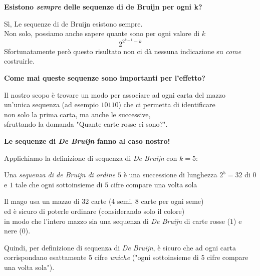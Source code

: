 \documentclass[8pt]{beamer}
\theoremstyle{plain}
\theoremstyle{definition}
\begin{document}
\begin{frame}
\begin{center}
 \textbf{Esistono \emph{sempre} delle sequenze di de Bruijn per ogni k?} 

\bigskip
\bigskip

Sì, Le sequenze di de Bruijn esistono sempre. \\Non solo, possiamo anche sapere quante sono per ogni valore di $k$
$$2^{2^{k-1}-k}$$
Sfortunatamente però questo risultato non ci dà nessuna indicazione su \emph{come} costruirle.	



\end{center}
\end{frame}


\begin{frame}
\begin{center}
\textbf{Come mai queste sequenze sono importanti per l'effetto?}

\bigskip
\bigskip

Il nostro scopo è trovare un modo per associare ad ogni carta del mazzo \\un'unica sequenza (ad esempio $10110$) che ci permetta di identificare \\non solo la prima carta, ma anche le successive, \\sfruttando la domanda "Quante carte rosse ci sono?".
\end{center}
\end{frame}


\begin{frame}
\begin{center}
\textbf{Le sequenze di \textit{De Bruijn} fanno al caso nostro!}

\bigskip
\bigskip

Applichiamo la definizione di sequenza di \textit{De Bruijn} con $k=5$:

\begin{block}

Una \emph{sequenza di de Bruijn di ordine $5$} è una successione di lunghezza $2^5=32$ di $0$ e $1$ tale che ogni sottoinsieme di $5$ cifre compare una volta sola
\end{block}

\medskip

Il mago usa un mazzo di 32 carte (4 semi, 8 carte per ogni seme) \\ed è sicuro di poterle ordinare (considerando solo il colore) \\in modo che l'intero mazzo sia una sequenza di \textit{De Bruijn} di carte rosse ($1$) e nere ($0$). 

\smallskip

Quindi, per definizione di sequenza di \textit{De Bruijn}, è sicuro che ad ogni carta corrispondano esattamente 5 cifre \textit{uniche} ("ogni sottoinsieme di 5 cifre compare una volta sola").
\end{center}
\end{frame}
\end{document}

